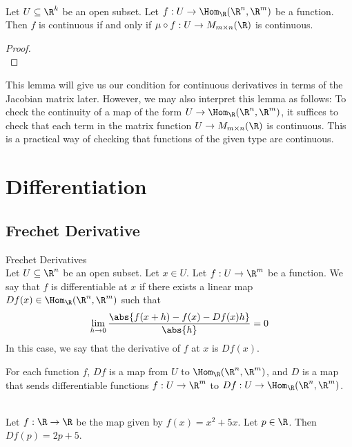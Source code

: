 \documentclass[a4paper]{article}
\begin{document}
\begin{lmm}{}{}\\
Let $U\subseteq\R^k$ be an open subset. Let $f:U\to\Hom_\R(\R^n,\R^m)$ be a function. Then $f$ is continuous if and only if $\mu\circ f:U\to M_{m\times n}(\R)$ is continuous. 
\begin{proof}\\
\end{proof}
\end{lmm}

This lemma will give us our condition for continuous derivatives in terms of the Jacobian matrix later. However, we may also interpret this lemma as follows: To check the continuity of a map of the form $U\to\Hom_\R(\R^n,\R^m)$, it suffices to check that each term in the matrix function $U\to M_{m\times n}(\R)$ is continuous. This is a practical way of checking that functions of the given type are continuous. 
 
\pagebreak
\section{Differentiation}
\subsection{Frechet Derivative}
\begin{defn}{Frechet Derivatives}{}\\
Let $U\subseteq\R^n$ be an open subset. Let $x\in U$. Let $f:U\to\R^m$ be a function. We say that $f$ is differentiable at $x$ if there exists a linear map $Df(x)\in\Hom_\R(\R^n,\R^m)$ such that $$\lim_{h\to 0}\frac{\abs{f(x +h)-f(x)-Df(x)h}}{\abs{h}}=0$$ In this case, we say that the derivative of $f$ at $x$ is $Df(x)$. 
\end{defn}

For each function $f$, $Df$ is a map from $U$ to $\Hom_\R(\R^n,\R^m)$, and $D$ is a map that sends differentiable functions $f:U\to\R^m$ to $Df:U\to\Hom_\R(\R^n,\R^m)$. 

\begin{eg}{}{}\\
Let $f:\R\to\R$ be the map given by $f(x)=x^2+5x$. Let $p\in\R$. Then $Df(p)=2p+5$. 
\end{eg}
\end{document}
